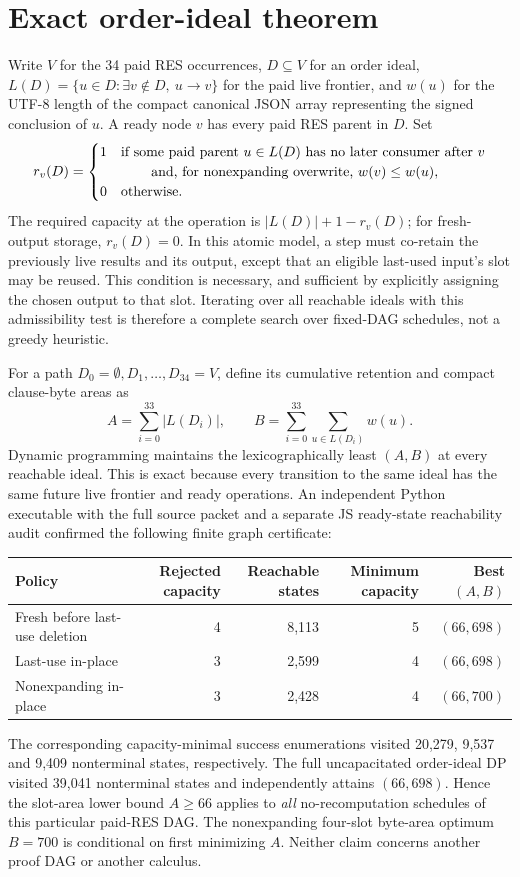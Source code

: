 \documentclass[11pt]{article}
\begin{document}
\section*{Exact order-ideal theorem}
Write $V$ for the 34 paid RES occurrences, $D\subseteq V$ for an order ideal, $L(D)=\{u\in D:\exists v\notin D,\ u\to v\}$ for the paid live frontier, and $w(u)$ for the UTF-8 length of the compact canonical JSON array representing the signed conclusion of $u$. A ready node $v$ has every paid RES parent in $D$. Set
\[
r_v(D)=
 \begin{cases}
 1&\text{if some paid parent }u\in L(D)\text{ has no later consumer after }v\\
   &\hspace{.3in}\text{and, for nonexpanding overwrite, }w(v)\le w(u),\\
 0&\text{otherwise}.
 \end{cases}
\]
The required capacity at the operation is $|L(D)|+1-r_v(D)$; for fresh-output storage, $r_v(D)=0$. In this atomic model, a step must co-retain the previously live results and its output, except that an eligible last-used input's slot may be reused. This condition is necessary, and sufficient by explicitly assigning the chosen output to that slot. Iterating over all reachable ideals with this admissibility test is therefore a complete search over fixed-DAG schedules, not a greedy heuristic.

For a path $D_0=\emptyset,D_1,\ldots,D_{34}=V$, define its cumulative retention and compact clause-byte areas as
\[
A=\sum_{i=0}^{33}|L(D_i)|,\qquad
B=\sum_{i=0}^{33}\sum_{u\in L(D_i)}w(u).
\]
Dynamic programming maintains the lexicographically least $(A,B)$ at every reachable ideal. This is exact because every transition to the same ideal has the same future live frontier and ready operations. An independent Python executable with the full source packet and a separate JS ready-state reachability audit confirmed the following finite graph certificate:
\begin{center}
\begin{tabular}{lrrrr}
\toprule
Policy & Rejected capacity & Reachable states & Minimum capacity & Best $(A,B)$\\
\midrule
Fresh before last-use deletion & 4 & 8,113 & 5 & $(66,698)$\\
Last-use in-place & 3 & 2,599 & 4 & $(66,698)$\\
Nonexpanding in-place & 3 & 2,428 & 4 & $(66,700)$\\
\bottomrule
\end{tabular}
\end{center}
The corresponding capacity-minimal success enumerations visited 20,279, 9,537 and 9,409 nonterminal states, respectively. The full uncapacitated order-ideal DP visited 39,041 nonterminal states and independently attains $(66,698)$. Hence the slot-area lower bound $A\ge66$ applies to \emph{all} no-recomputation schedules of this particular paid-RES DAG. The nonexpanding four-slot byte-area optimum $B=700$ is conditional on first minimizing $A$. Neither claim concerns another proof DAG or another calculus.
\end{document}
